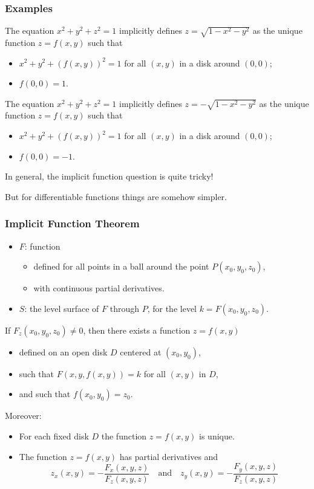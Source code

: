 \begin{frame}
  \frametitle{Examples}
The equation $x^2+y^2+z^2 = 1$ implicitly defines $z=\sqrt{1-x^2-y^2}$ as the unique function $z=f(x,y)$ such that
%
\begin{itemize}
  \item $x^2+ y^2+(f(x,y))^2 = 1$ for all $(x,y)$ in a disk around $(0,0)$;
  \item $f(0,0) = 1$.
\end{itemize}

\pause
The equation $x^2+y^2+z^2 = 1$ implicitly defines $z=-\sqrt{1-x^2-y^2}$ as the unique function $z=f(x,y)$ such that
%
\begin{itemize}
  \item $x^2+ y^2+(f(x,y))^2 = 1$ for all $(x,y)$ in a disk around $(0,0)$;
  \item $f(0,0) = -1$.
\end{itemize}

\pause
In general, the implicit function question is quite tricky!

\pause
But for differentiable functions things are somehow simpler.
\end{frame}

\begin{frame}
  \frametitle{Implicit Function Theorem}

    \begin{itemize}
      \item $F$: function
      \begin{itemize}
        \item defined for all points in a ball around the point $P(x_0,y_0,z_0)$,
        \item with continuous partial derivatives.
      \end{itemize}
      \item $S$: the level surface of $F$ through $P$, for the level $k = F(x_0,y_0,z_0)$.
    \end{itemize}

\pause If $F_z(x_0,y_0,z_0) \neq 0$, then there exists a function $z=f(x,y)$
\begin{itemize}
  \item defined on an open disk $D$ centered at $(x_0,y_0)$,
  \item such that $F(x,y,f(x,y)) = k$ for all $(x,y)$ in $D$,
  \item and such that $f(x_0,y_0) = z_0$.
\end{itemize}

\pause Moreover:
\begin{itemize}
  \item For each fixed disk $D$ the function $z=f(x,y)$ is unique.
  \item The function $z=f(x,y)$ has partial derivatives and
%
$$z_x(x,y) = -\frac{F_x(x,y,z)}{F_z(x,y,z)}\quad \text{and}\quad z_y(x,y) = -\frac{F_y(x,y,z)}{F_z(x,y,z)}$$
\end{itemize}
\end{frame}

